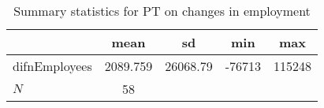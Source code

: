 \begin{table}[htbp]\centering
\def\sym#1{\ifmmode^{#1}\else\(^{#1}\)\fi}
\caption{Summary statistics for PT on changes in employment}
\begin{tabular}{l*{1}{cccc}}
\hline\hline
            &        mean&          sd&         min&         max\\
\hline
difnEmployees&    2089.759&    26068.79&      -76713&      115248\\
\hline
\(N\)       &          58&            &            &            \\
\hline\hline
\end{tabular}
\end{table}
